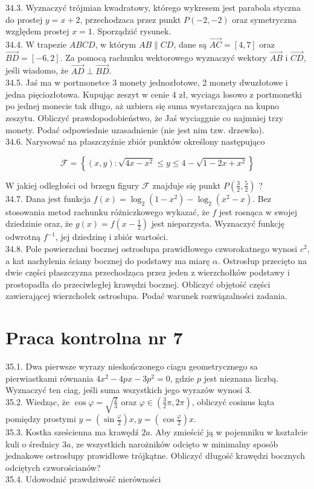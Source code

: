 \documentclass[10pt]{article}
\begin{document}
34.3. Wyznaczyć trójmian kwadratowy, którego wykresem jest parabola styczna do prostej $y=x+2$, przechodzaca przez punkt $P(-2,-2)$ oraz symetryczna względem prostej $x=1$. Sporządzić rysunek.\\
34.4. W trapezie $A B C D$, w którym $A B \| C D$, dane są $\overrightarrow{A C}=[4,7]$ oraz $\overrightarrow{B D}=[-6,2]$. Za pomocą rachunku wektorowego wyznaczyć wektory $\overrightarrow{A B}$ i $\overrightarrow{C D}$, jeśli wiadomo, że $\overrightarrow{A D} \perp \overrightarrow{B D}$.\\
34.5. Jaś ma w portmonetce 3 monety jednozłotowe, 2 monety dwuzłotowe i jedna pięciozłotowa. Kupując zeszyt w cenie 4 zł, wyciaga losowo z portmonetki po jednej monecie tak długo, aż uzbiera się suma wystarczająca na kupno zeszytu. Obliczyć prawdopodobieństwo, że Jaś wyciaggnie co najmniej trzy monety. Podać odpowiednie uzasadnienie (nie jest nim tzw. drzewko).\\
34.6. Narysować na płaszczyźnie zbiór punktów określony następująco

$$
\mathcal{F}=\left\{(x, y): \sqrt{4 x-x^{2}} \leq y \leq 4-\sqrt{1-2 x+x^{2}}\right\}
$$

W jakiej odległości od brzegu figury $\mathcal{F}$ znajduje się punkt $P\left(\frac{3}{2}, \frac{5}{2}\right)$ ?\\
34.7. Dana jest funkcja $f(x)=\log _{2}\left(1-x^{2}\right)-\log _{2}\left(x^{2}-x\right)$. Bez stosowania metod rachunku różniczkowego wykazać, że $f$ jest rosnąca w swojej dziedzinie oraz, że $g(x)=f\left(x-\frac{1}{2}\right)$ jest nieparzysta. Wyznaczyć funkcję odwrotną $f^{-1}$, jej dziedzinę i zbiór wartości.\\
34.8. Pole powierzchni bocznej ostrosłupa prawidłowego czworokatnego wynosi $c^{2}$, a kat nachylenia ściany bocznej do podstawy ma miarę $\alpha$. Ostrosłup przecięto na dwie części płaszczyzna przechodzạca przez jeden z wierzchołków podstawy i prostopadła do przeciwległej krawędzi bocznej. Obliczyć objętość części zawierającej wierzchołek ostrosłupa. Podać warunek rozwiązalności zadania.

\section*{Praca kontrolna nr 7}
35.1. Dwa pierwsze wyrazy nieskończonego ciagu geometrycznego sa pierwiastkami równania $4 x^{2}-4 p x-3 p^{2}=0$, gdzie $p$ jest nieznana liczbą. Wyznaczyć ten ciag, jeśli suma wszystkich jego wyrazów wynosi 3.\\
35.2. Wiedzạc, że $\cos \varphi=\sqrt{\frac{2}{3}}$ oraz $\varphi \in\left(\frac{3}{2} \pi, 2 \pi\right)$, obliczyć cosinus kąta pomiędzy prostymi $y=\left(\sin \frac{\varphi}{2}\right) x, y=\left(\cos \frac{\varphi}{2}\right) x$.\\
35.3. Kostka sześcienna ma krawędź $2 a$. Aby zmieścić ją w pojemniku w kształcie kuli o średnicy $3 a$, ze wszystkich narożników odcięto w minimalny sposób jednakowe ostrosłupy prawidłowe trójkątne. Obliczyć długość krawędzi bocznych odciętych czworościanów?\\
35.4. Udowodnić prawdziwość nierówności
\end{document}
